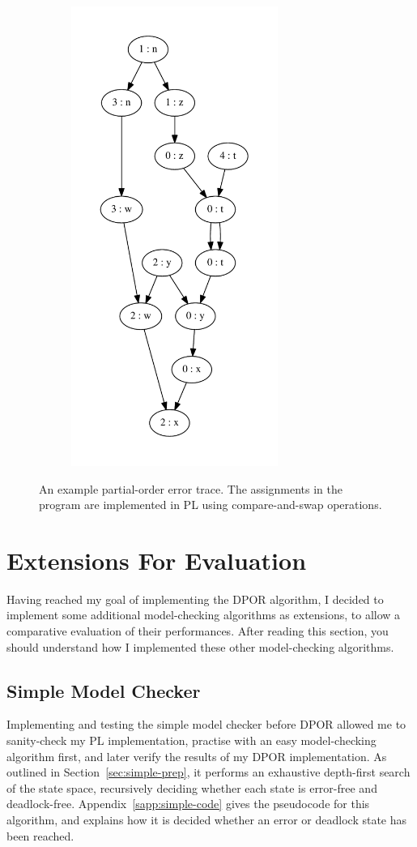 \documentclass[12pt,a4paper,twoside,openright]{report}
\begin{document}
\begin{figure}
\begin{subfigure}{0.5\textwidth}
		\includegraphics[height=15cm]{error_trace}
	\end{subfigure}
	\caption[An example partial-order
	error trace.]{An example partial-order
		error trace. The assignments in
		the program are implemented in PL
		using compare-and-swap operations.}
	\label{fig:trace-example}
\end{figure}

\section{Extensions For Evaluation}
Having reached my goal of implementing
the DPOR algorithm, I decided to
implement some additional model-checking
algorithms as extensions, to allow a
comparative evaluation of their
performances. After reading this
section, you should understand how
I implemented these other model-checking
algorithms.

\subsection{Simple Model Checker}
\label{sec:simple-imp}
Implementing and testing
the simple model checker
before DPOR allowed me to
sanity-check my PL implementation,
practise with an easy
model-checking algorithm first,
and later verify the results of
my DPOR implementation.
As outlined in
Section~\ref{sec:simple-prep}, it
performs an exhaustive depth-first
search of the state space,
recursively deciding whether each
state is error-free
and deadlock-free.
Appendix~\ref{sapp:simple-code} gives
the pseudocode for this algorithm,
and explains how it is decided whether
an error or deadlock state has been reached.
\end{document}
